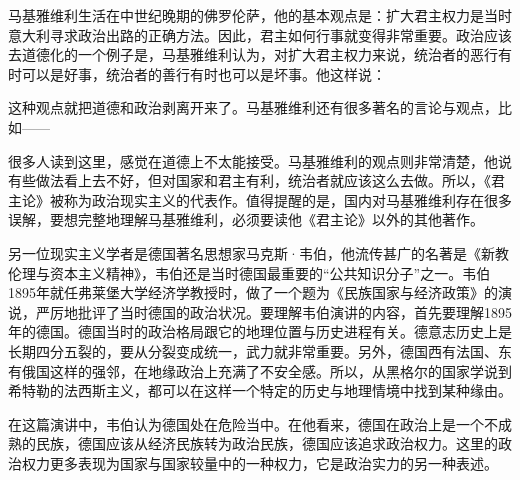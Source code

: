 马基雅维利生活在中世纪晚期的佛罗伦萨，他的基本观点是：扩大君主权力是当时意大利寻求政治出路的正确方法。因此，君主如何行事就变得非常重要。政治应该去道德化的一个例子是，马基雅维利认为，对扩大君主权力来说，统治者的恶行有时可以是好事，统治者的善行有时也可以是坏事。他这样说：


这种观点就把道德和政治剥离开来了。马基雅维利还有很多著名的言论与观点，比如——


很多人读到这里，感觉在道德上不太能接受。马基雅维利的观点则非常清楚，他说有些做法看上去不好，但对国家和君主有利，统治者就应该这么去做。所以，《君主论》被称为政治现实主义的代表作。值得提醒的是，国内对马基雅维利存在很多误解，要想完整地理解马基雅维利，必须要读他《君主论》以外的其他著作。

另一位现实主义学者是德国著名思想家马克斯·韦伯，他流传甚广的名著是《新教伦理与资本主义精神》，韦伯还是当时德国最重要的“公共知识分子”之一。韦伯1895年就任弗莱堡大学经济学教授时，做了一个题为《民族国家与经济政策》的演说，严厉地批评了当时德国的政治状况。要理解韦伯演讲的内容，首先要理解1895年的德国。德国当时的政治格局跟它的地理位置与历史进程有关。德意志历史上是长期四分五裂的，要从分裂变成统一，武力就非常重要。另外，德国西有法国、东有俄国这样的强邻，在地缘政治上充满了不安全感。所以，从黑格尔的国家学说到希特勒的法西斯主义，都可以在这样一个特定的历史与地理情境中找到某种缘由。

在这篇演讲中，韦伯认为德国处在危险当中。在他看来，德国在政治上是一个不成熟的民族，德国应该从经济民族转为政治民族，德国应该追求政治权力。这里的政治权力更多表现为国家与国家较量中的一种权力，它是政治实力的另一种表述。

